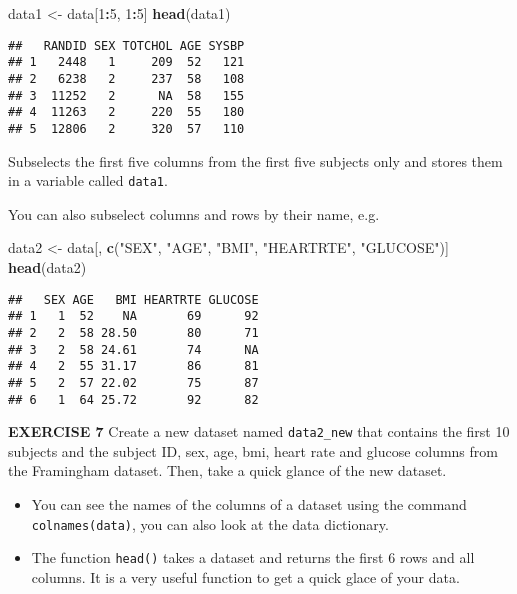 \documentclass[
]{article}
\newenvironment{Shaded}{\begin{snugshade}}{\end{snugshade}}
\newcommand{\DecValTok}[1]{\textcolor[rgb]{0.00,0.00,0.81}{#1}}
\newcommand{\KeywordTok}[1]{\textcolor[rgb]{0.13,0.29,0.53}{\textbf{#1}}}
\newcommand{\NormalTok}[1]{#1}
\newcommand{\OperatorTok}[1]{\textcolor[rgb]{0.81,0.36,0.00}{\textbf{#1}}}
\newcommand{\StringTok}[1]{\textcolor[rgb]{0.31,0.60,0.02}{#1}}
\begin{document}
\begin{Shaded}
\begin{Highlighting}[]
\NormalTok{data1 <-}\StringTok{ }\NormalTok{data[}\DecValTok{1}\OperatorTok{:}\DecValTok{5}\NormalTok{, }\DecValTok{1}\OperatorTok{:}\DecValTok{5}\NormalTok{]}
\KeywordTok{head}\NormalTok{(data1)}
\end{Highlighting}
\end{Shaded}

\begin{verbatim}
##   RANDID SEX TOTCHOL AGE SYSBP
## 1   2448   1     209  52   121
## 2   6238   2     237  58   108
## 3  11252   2      NA  58   155
## 4  11263   2     220  55   180
## 5  12806   2     320  57   110
\end{verbatim}

Subselects the first five columns from the first five subjects only and
stores them in a variable called \texttt{data1}.

You can also subselect columns and rows by their name, e.g.

\begin{Shaded}
\begin{Highlighting}[]
\NormalTok{data2 <-}\StringTok{ }\NormalTok{data[, }\KeywordTok{c}\NormalTok{(}\StringTok{"SEX"}\NormalTok{, }\StringTok{"AGE"}\NormalTok{, }\StringTok{"BMI"}\NormalTok{, }\StringTok{"HEARTRTE"}\NormalTok{, }\StringTok{"GLUCOSE"}\NormalTok{)]}
\KeywordTok{head}\NormalTok{(data2)}
\end{Highlighting}
\end{Shaded}

\begin{verbatim}
##   SEX AGE   BMI HEARTRTE GLUCOSE
## 1   1  52    NA       69      92
## 2   2  58 28.50       80      71
## 3   2  58 24.61       74      NA
## 4   2  55 31.17       86      81
## 5   2  57 22.02       75      87
## 6   1  64 25.72       92      82
\end{verbatim}

\textbf{EXERCISE 7} Create a new dataset named \texttt{data2\_new} that
contains the first 10 subjects and the subject ID, sex, age, bmi, heart
rate and glucose columns from the Framingham dataset. Then, take a quick
glance of the new dataset.

\begin{itemize}
\item
  You can see the names of the columns of a dataset using the command
  \texttt{colnames(data)}, you can also look at the data dictionary.
\item
  The function \texttt{head()} takes a dataset and returns the first 6
  rows and all columns. It is a very useful function to get a quick
  glace of your data.
\end{itemize}
\end{document}
